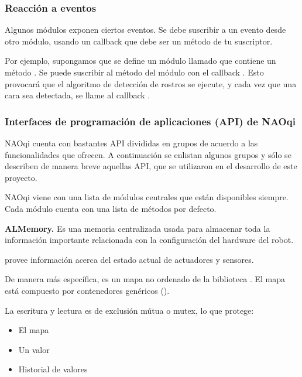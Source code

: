 \subsubsection{Reacción a eventos}
\label{\detokenize{chapter_one/naoqi:reaccion-a-eventos}}
Algunos módulos exponen ciertos eventos. Se debe suscribir a un evento desde otro módulo,
usando un callback que debe ser un método de tu suscriptor.

Por ejemplo, supongamos que se define un módulo llamado  que
contiene un método .
Se puede suscribir  al método  del módulo
 con el callback .
Esto provocará que el algoritmo de detección de rostros se ejecute, y cada vez
que una cara sea detectada, se llame al callback .


\subsubsection{Interfaces de programación de aplicaciones (API) de NAOqi}
\label{\detokenize{chapter_one/naoqi:interfaces-de-programacion-de-aplicaciones-api-de-naoqi}}
NAOqi cuenta con bastantes API divididas en grupos de acuerdo a las
funcionalidades que ofrecen. A continuación se enlistan algunos grupos
y sólo se describen de manera breve aquellas API,
que se utilizaron en el desarrollo de este proyecto.

NAOqi viene con una lista de módulos centrales que están disponibles siempre.
Cada módulo cuenta con una lista de métodos por defecto.


\textbf{ALMemory.}
\label{\detokenize{chapter_one/naoqi:id1}}
Es una memoria centralizada usada para almacenar toda la información importante
relacionada con la configuración del hardware del robot.

 provee información acerca del estado actual de actuadores y sensores.

De manera más específica,  es un mapa no ordenado de la biblioteca
. El mapa está compuesto por
contenedores genéricos ().

La escritura y lectura es de exclusión mútua o mutex, lo que protege:
\begin{itemize}
\item {} 
El mapa

\item {} 
Un valor

\item {} 
Historial de valores

\end{itemize}

